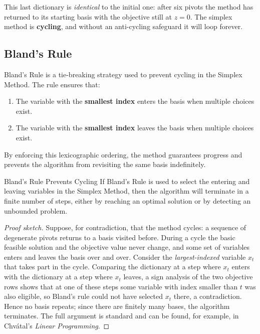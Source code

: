 \noindent This last dictionary is \emph{identical} to the initial one: after six pivots the method has returned to its starting basis with the objective still at $z=0$. The simplex method is \textbf{cycling}, and without an anti-cycling safeguard it will loop forever.

\subsection{Bland's Rule}
Bland's Rule is a tie-breaking strategy used to prevent cycling in the Simplex Method. The rule ensures that:
\begin{enumerate}
    \item The variable with the \textbf{smallest index} enters the basis when multiple choices exist.
    \item The variable with the \textbf{smallest index} leaves the basis when multiple choices exist.
\end{enumerate}
By enforcing this lexicographic ordering, the method guarantees progress and prevents the algorithm from revisiting the same basis indefinitely.

\begin{theorem}{Bland's Rule Prevents Cycling}{}
If Bland's Rule is used to select the entering and leaving variables in the Simplex Method, then the algorithm will terminate in a finite number of steps, either by reaching an optimal solution or by detecting an unbounded problem.
\end{theorem}

\begin{proof}[Proof sketch]
Suppose, for contradiction, that the method cycles: a sequence of degenerate pivots returns to a basis visited before. During a cycle the basic feasible solution and the objective value never change, and some set of variables enters and leaves the basis over and over. Consider the \emph{largest-indexed} variable $x_t$ that takes part in the cycle. Comparing the dictionary at a step where $x_t$ enters with the dictionary at a step where $x_t$ leaves, a sign analysis of the two objective rows shows that at one of these steps some variable with index smaller than $t$ was also eligible, so Bland's rule could not have selected $x_t$ there, a contradiction. Hence no basis repeats; since there are finitely many bases, the algorithm terminates. The full argument is standard and can be found, for example, in Chv\'atal's \emph{Linear Programming}.
\end{proof}


